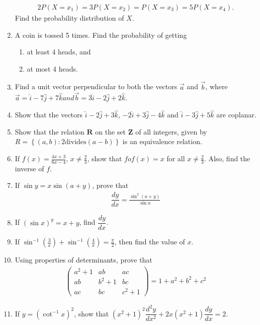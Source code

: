 \documentclass[10pt,-letter paper]{article}
\let\vec\mathbf{}
\let\vec\mathbf{}
\let\vec\mathbf{}
\providecommand{\cbrak}[1]{\ensuremath{\left\{#1\right\}}}
\providecommand{\brak}[1]{\ensuremath{\left(#1\right)}}
\newcommand{\myvec}[1]{\ensuremath{\begin{pmatrix}#1\end{pmatrix}}}
\begin{document}
\begin{enumerate}
\begin{align*}
		2P\brak{X = x_1} = 3P\brak{X = x_2} = P\brak{X = x_3} = 5P\brak{X = x_4}.
	\end{align*}
		Find the probability distribution of ${X}$.
\item A coin is tossed 5 times. Find the probability of getting 
	\begin{enumerate}[label = (\roman*)]
		\item at least 4 heads, and 
		\item at most 4 heads.
	\end{enumerate}
\item Find a unit vector perpendicular to both the vectors $\overrightarrow{a}$ and $\overrightarrow{b}$, where $\overrightarrow{a} = \hat{i} - 7\hat{j} + 7\hat{k} and \overrightarrow{b} = 3\hat{i} - 2\hat{j} + 2\hat{k}$.
\item Show that the vectors $\hat{i}-2\hat{j} +3\hat{k}$, $-2\hat{i}+3\hat{j}-4\hat{k}$ and $\hat{i}-3\hat{j}+5\hat{k}$ are coplanar.
\item Show that the relation $\vec{R}$ on the set $\vec{Z}$ of all integers, given by $R = \cbrak{\brak{a,b} :2 \text{divides} \brak{a-b}}$ is an equivalence relation.
\item If $f\brak{x} = \frac{4{x}+3}{6{x}-4}$, ${x}\neq\frac{2}{3}$, show that $fof\brak{x} = {x}$ for all ${x}\neq\frac{2}{3}$. Also, find the inverse of ${f}$.
\item If $\sin{y} = x\sin{\brak{a + y}}$, prove that 
	\begin{align*}
		\dfrac{dy}{dx} = \frac{\sin^{2}\brak{a + y}}{\sin{a}}
	\end{align*}
\item If $\brak{\sin x}^y = {x + y}$, find $\dfrac{dy}{dx}$.
\item If $\sin^{-1}\brak{\frac{3}{x}} + \sin^{-1}\brak{\frac{4}{x}} = \frac{\pi}{2}$, then find the value of $x$.
\item Using properties of determinants, prove that
	\begin{align*}
		\myvec{{a}^2 + {1} & {a}{b} & {a}{c} \\ {a}{b} & {b}^2+{1} & {b}{c} \\ {a}{c} & {b}{c} & {c}^2+{1}} = 1+{a}^2+{b}^2+{c}^2
	\end{align*}

\item If $y = \brak{\cot^{-1}{x}}^2$, show that $\brak{{x}^2+{1}}^2\dfrac{d^2y}{dx^2} + 2{x}\brak{{x^2}+{1}}\dfrac{dy}{dx} = 2$.


\end{enumerate}
\end{document}
